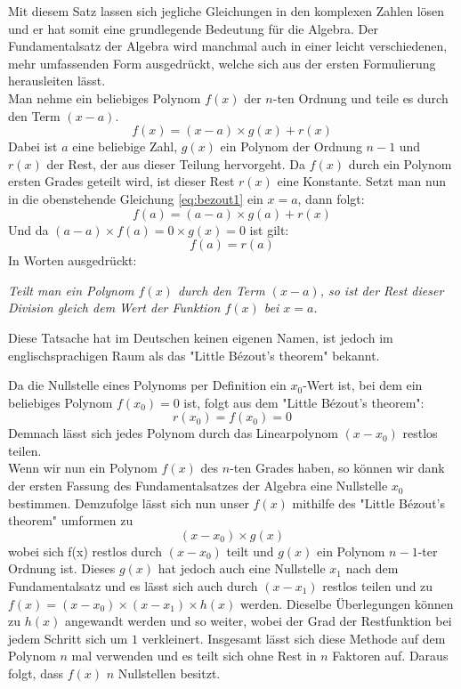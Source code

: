 \documentclass[a4paper,12pt]{article} %
\begin{document}
Mit diesem Satz lassen sich jegliche Gleichungen in den komplexen Zahlen lösen und er hat somit eine grundlegende Bedeutung für die Algebra.
Der Fundamentalsatz der Algebra wird manchmal auch in einer leicht verschiedenen, mehr umfassenden Form ausgedrückt, welche sich aus der ersten Formulierung herausleiten lässt.\\

\noindent Man nehme ein beliebiges Polynom $f(x)$ der $n$-ten Ordnung und teile es durch den Term $(x-a)$.
\begin{equation}\label{eq:bezout1}
f(x) = (x - a) \times g(x) + r(x)
\end{equation} 
Dabei ist $a$ eine beliebige Zahl, $g(x)$ ein Polynom der Ordnung $n-1$ und $r(x)$ der Rest, der aus dieser Teilung hervorgeht.
Da $f(x)$ durch ein Polynom ersten Grades geteilt wird, ist dieser Rest $r(x)$ eine Konstante.
Setzt man nun in die obenstehende Gleichung \eqref{eq:bezout1} ein $x=a$, dann folgt:
\[ f(a) = (a-a) \times g(a) + r(x) \]
Und da $(a - a) \times f(a) = 0 \times g(x) = 0 $ ist gilt:
\[ f(a) = r(a) \]
In Worten ausgedrückt:

\noindent \emph{Teilt man ein Polynom $f(x)$ durch den Term $(x-a)$, so ist der Rest dieser Division gleich dem Wert der Funktion $f(x)$ bei $x=a$.}

\noindent Diese Tatsache hat im Deutschen keinen eigenen Namen, ist jedoch im englischsprachigen Raum als das "Little Bézout's theorem" bekannt.

\noindent Da die Nullstelle eines Polynoms per Definition ein $x_0$-Wert ist, bei dem ein beliebiges Polynom $f(x_0) = 0$ ist, folgt aus dem "Little Bézout's theorem":
\begin{equation}\label{eq:bezout0}
r(x_0) = f(x_0)=0
\end{equation}
Demnach lässt sich jedes Polynom durch das Linearpolynom $(x-x_0)$ restlos teilen.\\

Wenn wir nun ein Polynom $f(x)$ des $n$-ten Grades haben, so können wir dank der ersten Fassung des Fundamentalsatzes der Algebra eine Nullstelle $x_0$ bestimmen. Demzufolge lässt sich nun unser $f(x)$ mithilfe des "Little Bézout's theorem" umformen zu
\[(x-x_0) \times g(x)\]
wobei sich f(x) restlos durch $(x-x_0)$ teilt und $g(x)$ ein Polynom $n-1$-ter Ordnung ist.
Dieses $g(x)$ hat jedoch auch eine Nullstelle $x_1$ nach dem Fundamentalsatz und es lässt sich auch durch $(x-x_1)$ restlos teilen und zu $f(x) = (x-x_0) \times (x-x_1) \times h(x)$ werden. Dieselbe Überlegungen können zu $h(x)$ angewandt werden und so weiter, wobei der Grad der Restfunktion bei jedem Schritt sich um $1$ verkleinert.
Insgesamt lässt sich diese Methode auf dem Polynom $n$ mal verwenden und es teilt sich ohne Rest in $n$ Faktoren auf. Daraus folgt, dass $f(x)$ $n$ Nullstellen besitzt.
\end{document}
